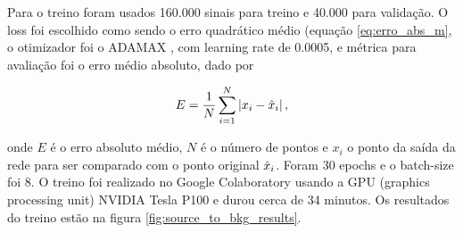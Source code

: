 \documentclass[a4paper,12pt,oneside]{book}
\begin{document}
\par Para o treino foram usados 160.000 sinais para treino e 40.000 para validação. O loss foi escolhido como sendo o erro quadrático médio (equação \ref{eq:erro_abs_m}, o otimizador foi o ADAMAX \cite{ADAMAX}, com learning rate de 0.0005, e métrica para avaliação foi o erro médio absoluto, dado por

\begin{equation}\label{eq:erro_abs_m}
    E = \frac{1}{N}\sum_{i = 1}^{N} \left | x_i - \Hat{x}_i\right |,
\end{equation}

onde $E$ é o erro absoluto médio, $N$ é o número de pontos e $x_i$ o ponto da saída da rede para ser comparado com o ponto original $\Hat{x}_i$. Foram 30 epochs e o batch-size foi 8. O treino foi realizado no Google Colaboratory \cite{google_colab} usando a GPU (graphics processing unit) NVIDIA Tesla P100 e durou cerca de 34 minutos. Os resultados do treino estão na figura \ref{fig:source_to_bkg_results}.

\end{document}
